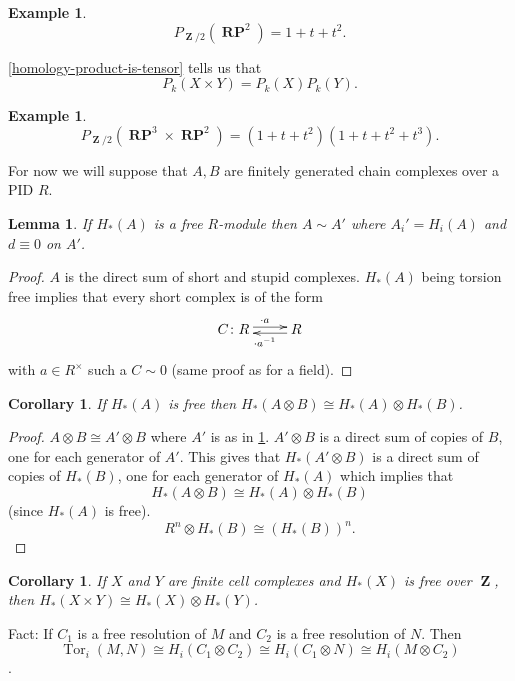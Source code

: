 \documentclass[10pt,]{book}
\theoremstyle{plain}
\newtheorem{corollary}[theorem]{Corollary}
\newtheorem{lemma}[theorem]{Lemma}
\theoremstyle{definition}
\newtheorem{example}[theorem]{Example}
\numberwithin{equation}{section}
\DeclareMathOperator{\Tor}{Tor}
\DeclareMathOperator{\ZZ}{\mathbf{Z}}
\DeclareMathOperator{\RP}{\mathbf{RP}}
\begin{document}
\begin{example}\label{example-24}
\[P_{\ZZ/2} (\RP^2) = 1 + t + t^2.\]\end{example}
\par
\ref{homology-product-is-tensor} tells us that \[P_k(X\times Y) = P_k(X)P_k(Y).\]%
\begin{example}\label{example-25}
\[P_{\ZZ/2}(\RP^3 \times \RP^2) = (1+t+t^2)(1+t+t^2+t^3).\]\end{example}
\par
For now we will suppose that \(A,B\) are finitely generated chain complexes over a PID \(R\).%
\begin{lemma}\label{free-homology-homotopic-zero-boundary}
If \(H_*(A)\) is a free \(R\)-module then \(A\sim A'\) where \(A_i' = H_i(A)\) and \(d\equiv 0\) on \(A'\).
          \end{lemma}
\begin{proof}
\(A\) is the direct sum of short and stupid complexes. \(H_*(A)\) being torsion free implies that every short complex is of the form
            \[
              \xymatrix{ C\colon R\ar@<.5ex>[r]^{\cdot a} & R \ar@<.5ex>[l]^{\cdot a^{-1}}}
            \]
            with \(a\in R^\times\) such a \(C \sim 0\) (same proof as for a field).
          \end{proof}
\begin{corollary}\label{corollary-8}
If \(H_*(A)\) is free then \(H_*(A\otimes B) \cong H_*(A) \otimes H_*(B)\).\end{corollary}
\begin{proof}
\(A\otimes B \cong A' \otimes B\) where \(A'\) is as in \ref{free-homology-homotopic-zero-boundary}.
            \(A'\otimes B\) is a direct sum of copies of \(B\), one for each generator of \(A'\).
            This gives that \(H_*(A'\otimes B)\) is  a direct sum of copies of \(H_*(B)\), one for each generator of \(H_*(A)\) which implies that
            \[H_*(A\otimes B) \cong H_*(A) \otimes H_*(B)\]
            (since \(H_*(A)\) is free).
            \[R^n \otimes H_*(B) \cong (H_*(B))^n.\]\end{proof}
\begin{corollary}\label{corollary-9}
If \(X\) and \(Y\) are finite cell complexes and \(H_*(X)\) is free over \(\ZZ\), then \(H_*(X\times Y) \cong H_*(X) \otimes H_*(Y)\).\end{corollary}
\par
Fact: If \(C_1\) is a free resolution of \(M\) and \(C_2\) is a free resolution of \(N\).
          Then
          \[\Tor_i(M,N) \cong H_i(C_1 \otimes C_2) \cong H_i(C_1 \otimes N) \cong H_i(M\otimes C_2)\].
\end{document}
